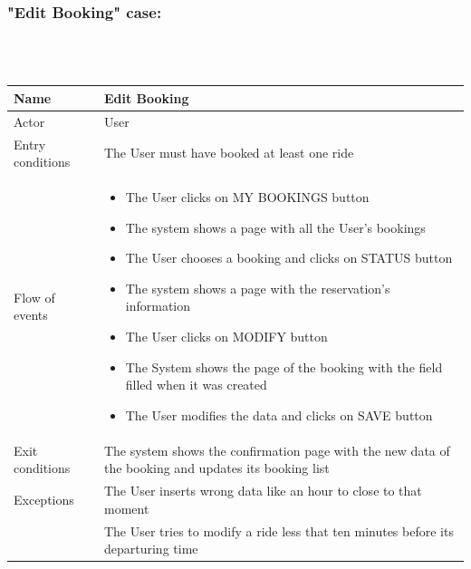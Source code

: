 \newpage

\subsubsection{"Edit Booking" case:}
\hfill \\
\\
\begin{tabular}{|p{3cm}|p{10cm}|}
\hline
Name & Edit Booking\\
\hline
Actor & User\\
\hline
Entry conditions & The User must have booked at least one ride\\
\hline
Flow of events &
	\begin{itemize}
			\item The User clicks on MY BOOKINGS button
			\item The system shows a page with all the User's bookings
			\item The User chooses a booking and clicks on STATUS button			
			\item The system shows a page with the reservation's information
			\item The User clicks on MODIFY button
			\item The System shows the page of the booking with the field filled when it was created
			\item The User modifies the data and clicks on SAVE button
	\end{itemize}\\
\hline
Exit conditions & The system shows the confirmation page with the new data of the booking and updates its booking list\\
\hline
Exceptions & The User inserts wrong data like an hour to close to that moment\\
			& The User tries to modify a ride less that ten minutes before its departuring time\\
\hline
\end {tabular}


\newpage
